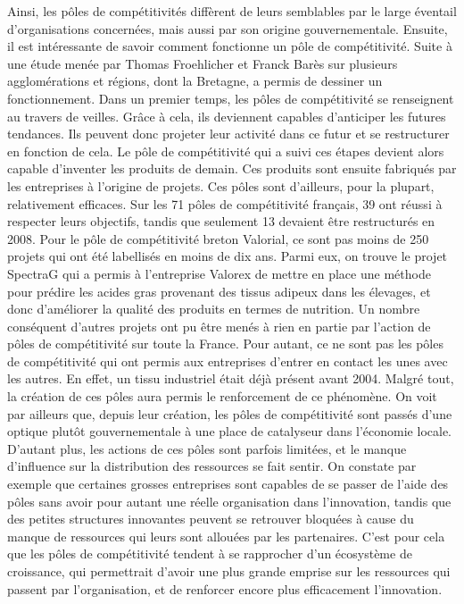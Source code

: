 \documentclass[a4paper,12pt]{report}
\begin{document}
		Ainsi, les pôles de compétitivités diffèrent de leurs semblables par le large éventail d’organisations concernées, mais aussi par son origine gouvernementale.
		Ensuite, il est intéressante de savoir comment fonctionne un pôle de compétitivité. Suite à une étude menée par Thomas Froehlicher et Franck Barès sur plusieurs agglomérations et régions, dont la Bretagne, a permis de dessiner un fonctionnement\cite{PolesCompetitiviteClusters}. Dans un premier temps, les pôles de compétitivité se renseignent au travers de veilles. Grâce à cela, ils deviennent capables d’anticiper les futures tendances. Ils peuvent donc projeter leur activité dans ce futur et se restructurer en fonction de cela. Le pôle de compétitivité qui a suivi ces étapes devient alors capable d’inventer les produits de demain. Ces produits sont ensuite fabriqués par les entreprises à l’origine de projets.
		Ces pôles sont d’ailleurs, pour la plupart, relativement efficaces. Sur les 71 pôles de compétitivité français, 39 ont réussi à respecter leurs objectifs, tandis que seulement 13 devaient être restructurés en 2008\cite{PolesCompetitiviteClusters}. Pour le pôle de compétitivité breton Valorial, ce sont pas moins de 250 projets qui ont été labellisés en moins de dix ans\cite{ProjetsValorial}. Parmi eux, on trouve le projet SpectraG qui a permis à l’entreprise Valorex de mettre en place une méthode pour prédire les acides gras provenant des tissus adipeux dans les élevages, et donc d’améliorer la qualité des produits en termes de nutrition\cite{ProjetsAboutis}. Un nombre conséquent d’autres projets ont pu être menés à rien en partie par l’action de pôles de compétitivité sur toute la France.
		Pour autant, ce ne sont pas les pôles de compétitivité qui ont permis aux entreprises d’entrer en contact les unes avec les autres. En effet, un tissu industriel était déjà présent avant 2004. Malgré tout, la création de ces pôles aura permis le renforcement de ce phénomène. On voit par ailleurs que, depuis leur création, les pôles de compétitivité sont passés d’une optique plutôt gouvernementale à une place de catalyseur dans l’économie locale.
		D’autant plus, les actions de ces pôles sont parfois limitées, et le manque d’influence sur la distribution des ressources se fait sentir. On constate par exemple que certaines grosses entreprises sont capables de se passer de l’aide des pôles sans avoir pour autant une réelle organisation dans l’innovation, tandis que des petites structures innovantes peuvent se retrouver bloquées à cause du manque de ressources qui leurs sont allouées par les partenaires.
		C’est pour cela que les pôles de compétitivité tendent à se rapprocher d’un écosystème de croissance, qui permettrait d’avoir une plus grande emprise sur les ressources qui passent par l’organisation, et de renforcer encore plus efficacement l’innovation.
		
\end{document}
